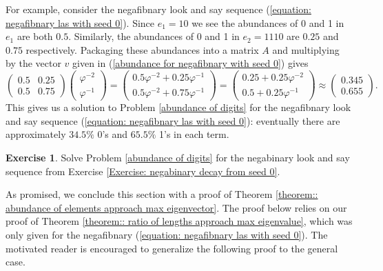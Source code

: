 \documentclass[reqno]{amsart}
\theoremstyle{definition}
\newtheorem{exercise}[theorem]{Exercise}
\begin{document}
For example, consider the negafibnary look and say sequence (\ref{equation: negafibnary las with seed 0}). Since $e_1=10$ we see the abundances of 0 and 1 in $e_1$ are both $0.5$. Similarly, the abundances of 0 and 1 in $e_2=1110$ are $0.25$ and $0.75$ respectively. Packaging these abundances into a matrix $A$ and multiplying by the vector $v$ given in (\ref{abundance for negafibnary with seed 0}) gives 
\begin{equation*}\label{negafibnary abundance of digits for seed 0}
    \begin{pmatrix}
        0.5 & 0.25\\ 
        0.5 & 0.75
    \end{pmatrix}
    \begin{pmatrix}
        \varphi^{-2}\\ 
        \varphi^{-1}
    \end{pmatrix}
    =
    \begin{pmatrix}
        0.5\varphi^{-2}+0.25\varphi^{-1} \\
        0.5\varphi^{-2}+0.75\varphi^{-1}
    \end{pmatrix}
    =
    \begin{pmatrix}
        0.25+0.25\varphi^{-2} \\
        0.5+0.25\varphi^{-1}
    \end{pmatrix}
    \approx
    \begin{pmatrix}
        0.345 \\
        0.655
    \end{pmatrix}.
\end{equation*}
This gives us a solution to Problem \ref{abundance of digits} for the negafibnary look and say sequence (\ref{equation: negafibnary las with seed 0}): eventually there are approximately $34.5\%$ 0's and $65.5\%$ 1's in each term.

\begin{exercise}
    Solve Problem \ref{abundance of digits} for the negabinary look and say sequence from Exercise \ref{Exercise: negabinary decay from seed 0}.
\end{exercise}

As promised, we conclude this section with a proof of Theorem \ref{theorem:: abundance of elements approach max eigenvector}. The proof below relies on our proof of Theorem \ref{theorem:: ratio of lengths approach max eigenvalue}, which was only given for the negafibnary (\ref{equation: negafibnary las with seed 0}). The motivated reader is encouraged to generalize the following proof to the general case.  
\end{document}
